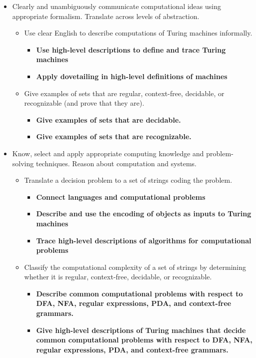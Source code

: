 \begin{itemize}
    \item Clearly and unambiguously communicate computational ideas using appropriate formalism. Translate across levels of abstraction.
    \begin{itemize}
        \item Use clear English to describe computations of Turing machines informally.
        \begin{itemize}
                \item {\bf Use high-level descriptions to define and trace Turing machines}
                \item {\bf Apply dovetailing in high-level definitions of machines}
        \end{itemize}
        \item Give examples of sets that are regular, context-free, decidable, or recognizable (and prove that they are).
        \begin{itemize}
          \item {\bf Give examples of sets that are decidable.}
          \item {\bf Give examples of sets that are recognizable.}
       \end{itemize}
    \end{itemize}
    \item Know, select and apply appropriate computing knowledge and problem-solving techniques. Reason about computation and systems.
    \begin{itemize}
        \item Translate a decision problem to a set of strings coding the problem.
        \begin{itemize}
        \item {\bf Connect languages and computational problems}
        \item {\bf Describe and use the encoding of objects as inputs to Turing machines}
        \item {\bf Trace high-level descriptions of algorithms for computational problems}
        \end{itemize}
    \item Classify the computational complexity of a set of strings by determining whether it is regular, context-free, decidable, or recognizable.
    \begin{itemize}
    \item {\bf Describe common computational problems with respect to DFA, NFA, regular expressions, PDA, and context-free grammars.}
    \item {\bf Give high-level descriptions of Turing machines that decide common computational problems with respect to DFA, NFA, regular expressions, PDA, and context-free grammars.}
\end{itemize}
\end{itemize}
\end{itemize}

